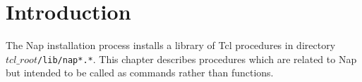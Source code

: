 
\section{Introduction}
\label{lib-proc-intro}

The Nap installation process installs a library of Tcl procedures in directory
$\mathit{tcl\_root}$\texttt{/lib/nap*.*}.
This chapter describes procedures which are related to Nap
but intended to be called as commands rather than functions.
